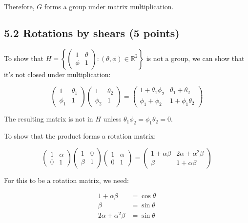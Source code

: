 \documentclass{article}
\begin{document}
Therefore, $G$ forms a group under matrix multiplication.

\subsection*{5.2 Rotations by shears (5 points)}

To show that $H = \left\{\begin{pmatrix} 1 & \theta \\ \phi & 1 \end{pmatrix} : (\theta, \phi) \in \mathbb{R}^2\right\}$ is not a group, we can show that it's not closed under multiplication:

\[
\begin{pmatrix} 1 & \theta_1 \\ \phi_1 & 1 \end{pmatrix} \begin{pmatrix} 1 & \theta_2 \\ \phi_2 & 1 \end{pmatrix} = \begin{pmatrix} 1 + \theta_1\phi_2 & \theta_1 + \theta_2 \\ \phi_1 + \phi_2 & 1 + \phi_1\theta_2 \end{pmatrix}
\]

The resulting matrix is not in $H$ unless $\theta_1\phi_2 = \phi_1\theta_2 = 0$.

To show that the product forms a rotation matrix:

\[
\begin{pmatrix} 1 & \alpha \\ 0 & 1 \end{pmatrix} \begin{pmatrix} 1 & 0 \\ \beta & 1 \end{pmatrix} \begin{pmatrix} 1 & \alpha \\ 0 & 1 \end{pmatrix} = \begin{pmatrix} 1 + \alpha\beta & 2\alpha + \alpha^2\beta \\ \beta & 1 + \alpha\beta \end{pmatrix}
\]

For this to be a rotation matrix, we need:

\begin{align*}
1 + \alpha\beta &= \cos\theta \\
\beta &= \sin\theta \\
2\alpha + \alpha^2\beta &= \sin\theta
\end{align*}
\end{document}
